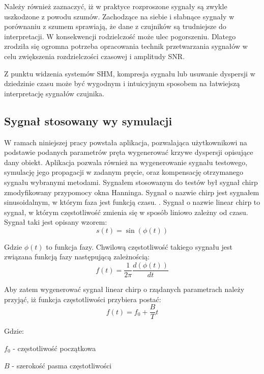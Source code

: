 Należy również zaznaczyć, iż w praktyce rozproszone sygnały są zwykle uszkodzone z powodu szumów. Zachodzące na siebie i słabnące sygnały w porównaniu z szumem sprawiają, że dane z czujników są trudniejsze do interpretacji. W konsekwencji rodzielczość może ulec pogorszeniu. Dlatego zrodziła się ogromna potrzeba opracowania technik przetwarzania sygnałów w celu zwiększenia rozdzielczości czasowej i amplitudy SNR.

Z punktu widzenia systemów SHM, kompresja sygnału lub usuwanie dyspersji w dziedzinie czasu może być wygodnym i intuicyjnym sposobem na łatwiejszą interpretację sygnałów czujnika.

\subsection{Sygnał stosowany wy symulacji}
W ramach niniejszej pracy powstała aplikacja, pozwalająca użytkownikowi na podstawie podanych parametrów pręta wygenerować krzywe dyspersji opisujące dany obiekt. Aplikacja pozwala również na wygenerowanie sygnału testowego, symulację jego propagacji w zadanym pręcie, oraz kompensację otrzymanego sygnału wybranymi metodami. Sygnałem stosowanym do testów był sygnał chirp zmodyfikowany przypomocy okna Hanninga.
	Sygnał o nazwie chirp jest sygnałem sinusoidalnym, w którym faza jest funkcją czasu. \cite{kasia3}. Sygnał o nazwie linear chirp to sygnał, w którym częstotliwość zmienia się w sposób liniowo zależny od czasu. Sygnał taki jest opisany wzorem:
	\begin{equation}
	s(t) = \sin(\phi (t))
	\end{equation}
	
	Gdzie $\phi (t)$ to funkcja fazy. Chwilową częstotliwość takiego sygnału jest związana funkcją fazy następującą zależnością:
	\begin{equation}
	f(t) = \frac{1}{2\pi}\frac{d(\phi (t))}{dt} \label{eq:f(t)_z_phi}
	\end{equation}
	
	Aby zatem wygenerować sygnał linear chirp o rządanych parametrach należy przyjąć, iż funkcja częstotliwości przybiera postać:
	\begin{equation}
	f(t) = f_0+\frac{B}{T}t \label{eq:f(t)_liniowo}
	\end{equation}
	
	Gdzie:
	
	$f_0$ - częstotliwość początkowa
	
	$B$ - szerokość pasma częstotliwości
	

